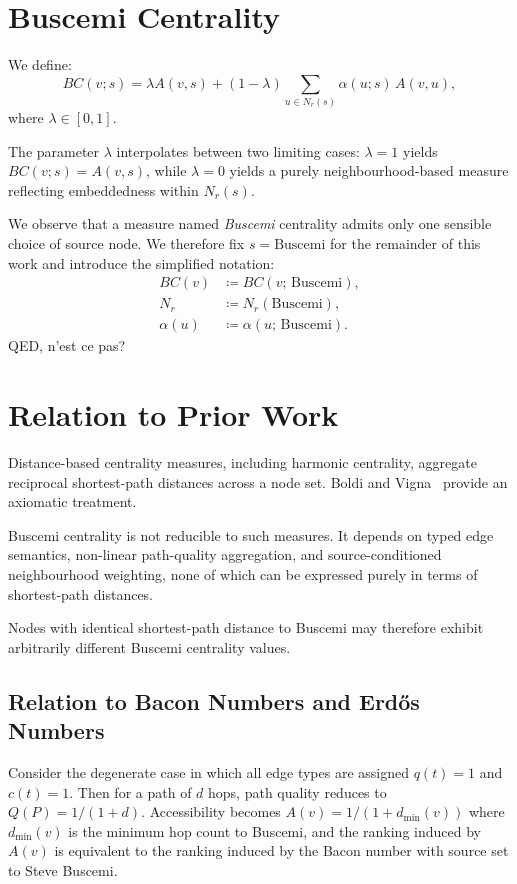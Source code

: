 \documentclass[11pt]{article}
\begin{document}
\section{Buscemi Centrality}

We define:
\begin{equation}
BC(v;s) = \lambda A(v,s) + (1-\lambda) \sum_{u \in N_r(s)} \alpha(u;s)\, A(v,u),
\end{equation}
where $\lambda \in [0,1]$.

The parameter $\lambda$ interpolates between two limiting cases: $\lambda = 1$ yields $BC(v;s) = A(v,s)$, while $\lambda = 0$ yields a purely neighbourhood-based measure reflecting embeddedness within $N_r(s)$.

We observe that a measure named \emph{Buscemi} centrality admits only one sensible choice of source node. We therefore fix $s = \text{Buscemi}$ for the remainder of this work and introduce the simplified notation:
\begin{align}
BC(v)     &\coloneqq BC(v;\,\text{Buscemi}), \\
N_r       &\coloneqq N_r(\text{Buscemi}), \\
\alpha(u) &\coloneqq \alpha(u;\,\text{Buscemi}).
\end{align}
QED, n'est ce pas?

\section{Relation to Prior Work}

Distance-based centrality measures, including harmonic centrality, aggregate reciprocal shortest-path distances across a node set. Boldi and Vigna~\cite{boldi2014axioms} provide an axiomatic treatment.

Buscemi centrality is not reducible to such measures. It depends on typed edge semantics, non-linear path-quality aggregation, and source-conditioned neighbourhood weighting, none of which can be expressed purely in terms of shortest-path distances.

Nodes with identical shortest-path distance to Buscemi may therefore exhibit arbitrarily different Buscemi centrality values.

\subsection{Relation to Bacon Numbers and Erd\H{o}s Numbers}

Consider the degenerate case in which all edge types are assigned $q(t) = 1$ and $c(t) = 1$. Then for a path of $d$ hops, path quality reduces to $Q(P) = 1/(1+d)$. Accessibility becomes $A(v) = 1/(1 + d_{\min}(v))$ where $d_{\min}(v)$ is the minimum hop count to Buscemi, and the ranking induced by $A(v)$ is equivalent to the ranking induced by the Bacon number with source set to Steve Buscemi.
\end{document}
